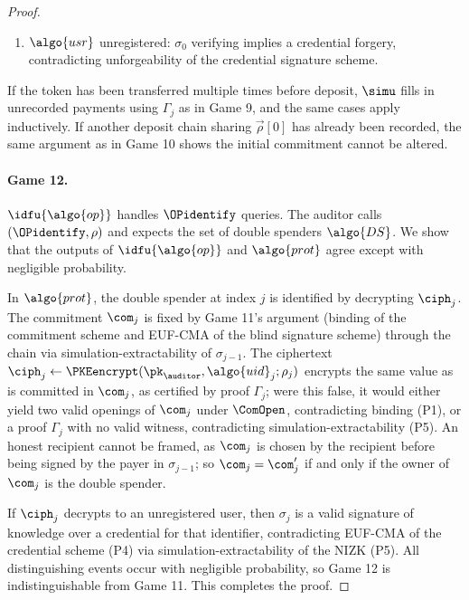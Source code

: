 \begin{proof}
\begin{enumerate}[label=\alph*)]
  \item $\algo{usr}$ unregistered: $\sigma_0$ verifying implies a credential
    forgery, contradicting unforgeability of the credential signature scheme.

\end{enumerate}

If the token has been transferred multiple times before deposit, $\simu$ fills
in unrecorded payments using $\Gamma_j$ as in Game 9, and the same cases apply
inductively. If another deposit chain sharing $\vec{\rho}[0]$ has already been
recorded, the same argument as in Game 10 shows the initial commitment cannot
be altered.

\paragraph{Game 12.} $\idfu{\algo{op}}$ handles $\OPidentify$ queries. The auditor
calls $(\OPidentify, \rho)$ and expects the set of double spenders
$\algo{DS}$. We show that the outputs of $\idfu{\algo{op}}$ and $\algo{prot}$ agree
except with negligible probability.

In $\algo{prot}$, the double spender at index $j$ is identified by decrypting
$\ciph_j$. The commitment $\com_j$ is fixed by Game 11's argument (binding of
the commitment scheme and EUF-CMA of the blind signature scheme) through the
chain via simulation-extractability of $\sigma_{j-1}$.  The ciphertext $\ciph_j
\leftarrow \PKEencrypt(\pk_{\auditor}, \algo{uid}_j; \rho_j)$ encrypts the same
value as is committed in $\com_j$, as certified by proof $\Gamma_j$; were this
false, it would either yield two valid openings of $\com_j$ under $\ComOpen$,
contradicting binding (P1), or a proof $\Gamma_j$ with no valid witness,
contradicting simulation-extractability (P5). An honest recipient cannot be
framed, as $\com_j$ is chosen by the recipient before being signed by the payer
in $\sigma_{j-1}$; so $\com_j = \com_j'$ if and only if the owner of $\com_j$
is the double spender.

If $\ciph_j$ decrypts to an unregistered user, then $\sigma_j$ is a valid
signature of knowledge over a credential for that identifier, contradicting
EUF-CMA of the credential scheme (P4) via simulation-extractability of the NIZK
(P5). All distinguishing events occur with negligible probability, so Game 12
is indistinguishable from Game 11. This completes the proof.

\end{proof}